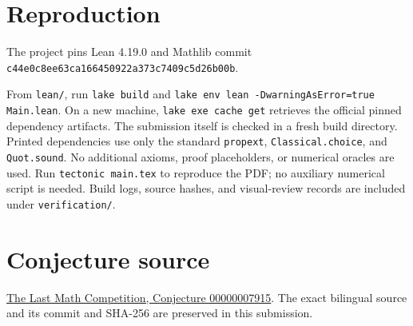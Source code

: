 \documentclass[11pt]{article}
\begin{document}
\section*{Reproduction}
The project pins Lean 4.19.0 and Mathlib commit
\\\texttt{c44e0c8ee63ca166450922a373c7409c5d26b00b}.\par
From \texttt{lean/}, run \texttt{lake build} and
\texttt{lake env lean -DwarningAsError=true Main.lean}.
On a new machine, \texttt{lake exe cache get} retrieves the official
pinned dependency artifacts. The submission itself is checked in a fresh
build directory. Printed dependencies use only the standard
\texttt{propext}, \texttt{Classical.choice}, and \texttt{Quot.sound}.
No additional axioms, proof placeholders, or numerical oracles are used.
Run \texttt{tectonic main.tex} to reproduce the PDF; no auxiliary numerical
script is needed. Build logs, source hashes, and visual-review records
are included under \texttt{verification/}.
\section*{Conjecture source}
\href{https://github.com/The-Last-Math-Competition/The-Last-Math-Competition/blob/main/conjectures/00000007915.md}{The Last Math Competition, Conjecture 00000007915}. The exact bilingual source and its commit and SHA-256 are preserved in this submission.
\end{document}
